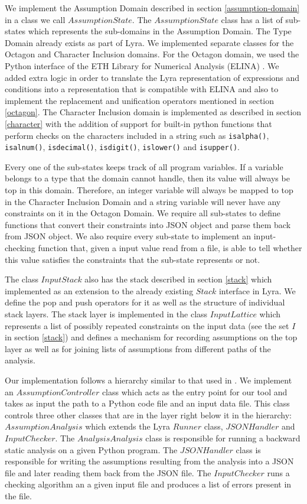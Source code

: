\documentclass[10pt]{report}
\begin{document}
We implement the Assumption Domain described in section \ref{assumption-domain} in a class we call $ AssumptionState $.  The $ AssumptionState $ class has a list of sub-states which represents the sub-domains in the Assumption Domain. The Type Domain already exists as part of Lyra. We implemented separate classes for the Octagon and Character Inclusion domains. For the Octagon domain, we used the Python interface of the ETH Library for Numerical Analysis (ELINA) \cite{singh}. We added extra logic in order to translate the Lyra representation of expressions and conditions into a representation that is compatible with ELINA and also to implement the replacement and unification operators mentioned in section \ref{octagon}. The Character Inclusion domain is implemented as described in section \ref{character} with the addition of support for built-in python functions that perform checks on the characters included in a string such as \verb|isalpha()|, \verb|isalnum()|, \verb|isdecimal()|, \verb|isdigit()|, \verb|islower()| and \verb|isupper()|. 

Every one of the sub-states keeps track of all program variables. If a variable belongs to a type that the domain cannot handle, then its value will always be top in this domain. Therefore, an integer variable will always be mapped to top in the Character Inclusion Domain and a string variable will never have any constraints on it in the Octagon Domain. We require all sub-states to define functions that convert their constraints into JSON object and parse them back from JSON object. We also require every sub-state to implement an input-checking function that, given a input value read from a file, is able to tell whether this value satisfies the constraints that the sub-state represents or not. 

The class $ InputStack $ also has the stack described in section \ref{stack} which implemented as an extension to the already existing $ Stack $ interface in Lyra. We define the pop and push operators for it as well as the structure of individual stack layers. The stack layer is implemented in the class $ InputLattice $ which represents a list of possibly repeated constraints on the input data (see the set $ I $ in section \ref{stack}) and defines a mechanism for recording assumptions on the top layer as well as for joining lists of assumptions from different paths of the analysis. 

Our implementation follows a hierarchy similar to that used in \cite{madelin}. We implement an $ AssumptionController $ class which acts as the entry point for our tool and takes as input the path to a Python code file and an input data file. This class controls three other classes that are in the layer right below it in the hierarchy: $ AssumptionAnalysis $ which extends the Lyra $ Runner  $ class, $ JSONHandler $ and $ InputChecker $. The $ AnalysisAnalysis $ class is responsible for running a backward static analysis on a given Python program. The $ JSONHandler $ class is responsible for writing the assumptions resulting from the analysis into a JSON file and later reading them back from the JSON file. The $ InputChecker $ runs a checking algorithm an a given input file and produces a list of errors present in the file. 
\end{document}
